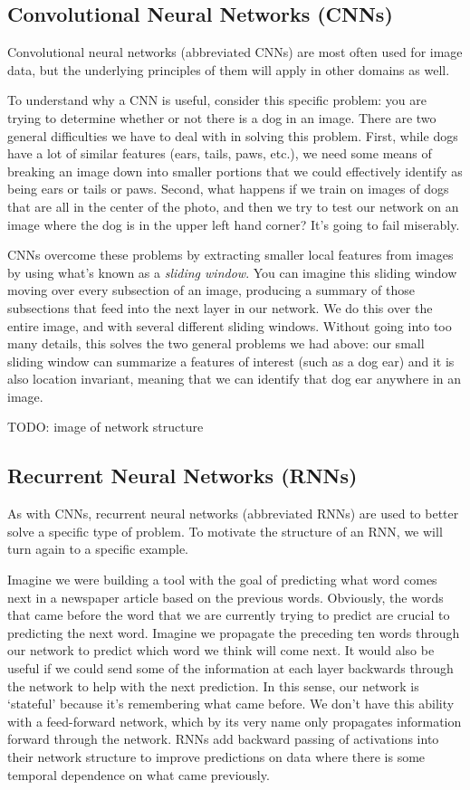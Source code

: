 \subsection{Convolutional Neural Networks (CNNs)}
Convolutional neural networks (abbreviated CNNs) are most often used for image data, but the underlying principles of them will apply in other domains as well.

To understand why a CNN is useful, consider this specific problem: you are trying to determine whether or not there is a dog in an image. There are two general difficulties we have to deal with in solving this problem. First, while dogs have a lot of similar features (ears, tails, paws, etc.), we need some means of breaking an image down into smaller portions that we could effectively identify as being ears or tails or paws. Second, what happens if we train on images of dogs that are all in the center of the photo, and then we try to test our network on an image where the dog is in the upper left hand corner? It's going to fail miserably.

CNNs overcome these problems by extracting smaller local features from images by using what's known as a \textit{sliding window}. You can imagine this sliding window moving over every subsection of an image, producing a summary of those subsections that feed into the next layer in our network. We do this over the entire image, and with several different sliding windows. Without going into too many details, this solves the two general problems we had above: our small sliding window can summarize a features of interest (such as a dog ear) and it is also location invariant, meaning that we can identify that dog ear anywhere in an image.

TODO: image of network structure

\subsection{Recurrent Neural Networks (RNNs)}
As with CNNs, recurrent neural networks (abbreviated RNNs) are used to better solve a specific type of problem. To motivate the structure of an RNN, we will turn again to a specific example.

Imagine we were building a tool with the goal of predicting what word comes next in a newspaper article based on the previous words. Obviously, the words that came before the word that we are currently trying to predict are crucial to predicting the next word. Imagine we propagate the preceding ten words through our network to predict which word we think will come next. It would also be useful if we could send some of the information at each layer backwards through the network to help with the next prediction. In this sense, our network is `stateful' because it's remembering what came before. We don't have this ability with a feed-forward network, which by its very name only propagates information forward through the network. RNNs add backward passing of activations into their network structure to improve predictions on data where there is some temporal dependence on what came previously.

